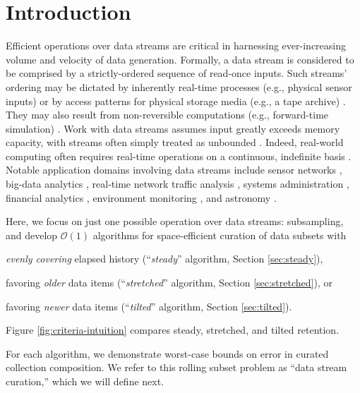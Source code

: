 \section{Introduction} \label{sec:introduction}

Efficient operations over data streams are critical in harnessing ever-increasing volume and velocity of data generation.
Formally, a data stream is considered to be comprised by a strictly-ordered sequence of read-once inputs.
Such streams' ordering may be dictated by inherently real-time processes (e.g., physical sensor inputs) or by access patterns for physical storage media (e.g., a tape archive) \citep{henzinger1998computing}.
They may also result from non-reversible computations (e.g., forward-time simulation) \citep{abdulla2004simulation,schutzel2014stream}.
Work with data streams assumes input greatly exceeds memory capacity, with streams often simply treated as unbounded \citep{jiang2006research}.
Indeed, real-world computing often requires real-time operations on a continuous, indefinite basis \citep{cordeiro2016online}.
Notable application domains involving data streams include sensor networks \citep{elnahrawy2003research}, big-data analytics \citep{he2010comet}, real-time network traffic analysis \citep{johnson2005streams,muthukrishnan2005data}, systems administration \citep{fischer2012real}, financial analytics \citep{rajeshwari2016real,agarwal2009faster}, environment monitoring \citep{hill2009real}, and astronomy \citep{graham2012data}.

Here, we focus on just one possible operation over data streams: subsampling, and develop $\mathcal{O}(1)$ algorithms for space-efficient curation of data subsets with
\begin{enumerate*}
\item \textit{evenly covering} elapsed history (``\textit{steady}'' algorithm, Section \ref{sec:steady}),
\item favoring \textit{older} data items (``\textit{stretched}'' algorithm, Section \ref{sec:stretched}), or
\item favoring \textit{newer} data items (``\textit{tilted}'' algorithm, Section \ref{sec:tilted}).
\end{enumerate*}
Figure \ref{fig:criteria-intuition} compares steady, stretched, and tilted retention.

For each algorithm, we demonstrate worst-case bounds on error in curated collection composition.
We refer to this rolling subset problem as ``data stream curation,'' which we will define next.






